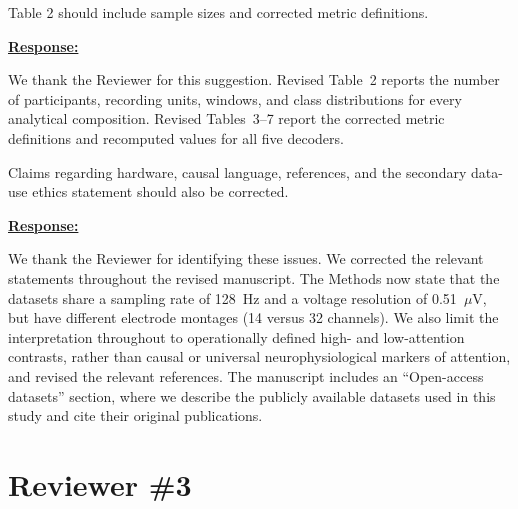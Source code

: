 \documentclass{article}
\begin{document}
\vspace{0.3cm}


\begin{cmt}{}{}

Table 2 should include sample sizes and corrected metric definitions.

\end{cmt}
\vspace{0.1cm}
\noindent
\underline{\textbf{Response:}}
\vspace{0.2cm}

We thank the Reviewer for this suggestion. Revised Table~2 reports the number
of participants, recording units, windows, and class distributions for every
analytical composition. Revised Tables~3--7 report the corrected metric
definitions and recomputed values for all five decoders.

\vspace{0.3cm}


\begin{cmt}{}{}

Claims regarding hardware, causal language, references, and the secondary
data-use ethics statement should also be corrected.

\end{cmt}
\vspace{0.1cm}
\noindent
\underline{\textbf{Response:}}
\vspace{0.2cm}

We thank the Reviewer for identifying these issues. We corrected the relevant
statements throughout the revised manuscript. The Methods now state that the
datasets share a sampling rate of 128~Hz and a voltage resolution of
0.51~$\mu$V, but have different electrode montages (14 versus 32 channels). We
also limit the interpretation throughout to operationally defined high- and
low-attention contrasts, rather than causal or universal neurophysiological
markers of attention, and revised the relevant references. The manuscript
includes an ``Open-access datasets'' section, where we describe the publicly
available datasets used in this study and cite their original publications.

\vspace{0.3cm}


\newpage
\setcounter{tcb@cnt@cmt}{0}
\section*{Reviewer \#3}
\end{document}

